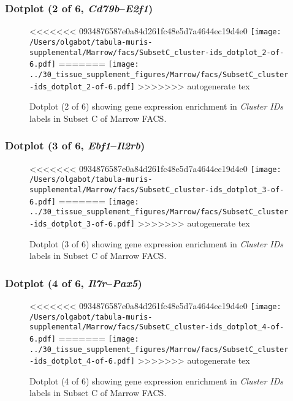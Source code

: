 \clearpage

\subsubsection{Dotplot (2 of 6, \emph{Cd79b}--\emph{E2f1})}
\begin{figure}[h]
\centering
<<<<<<< 0934876587e0a84d261fc48e5d7a4644ec19d4e0
\texttt{[image: /Users/olgabot/tabula-muris-supplemental/Marrow/facs/SubsetC\_cluster-ids\_dotplot\_2-of-6.pdf]}
=======
\texttt{[image: ../30\_tissue\_supplement\_figures/Marrow/facs/SubsetC\_cluster-ids\_dotplot\_2-of-6.pdf]}
>>>>>>> autogenerate tex

\caption{ Dotplot (2 of 6)  showing gene expression enrichment in \emph{Cluster IDs} labels in Subset C of Marrow FACS. }
\end{figure}


\clearpage

\subsubsection{Dotplot (3 of 6, \emph{Ebf1}--\emph{Il2rb})}
\begin{figure}[h]
\centering
<<<<<<< 0934876587e0a84d261fc48e5d7a4644ec19d4e0
\texttt{[image: /Users/olgabot/tabula-muris-supplemental/Marrow/facs/SubsetC\_cluster-ids\_dotplot\_3-of-6.pdf]}
=======
\texttt{[image: ../30\_tissue\_supplement\_figures/Marrow/facs/SubsetC\_cluster-ids\_dotplot\_3-of-6.pdf]}
>>>>>>> autogenerate tex

\caption{ Dotplot (3 of 6)  showing gene expression enrichment in \emph{Cluster IDs} labels in Subset C of Marrow FACS. }
\end{figure}


\clearpage

\subsubsection{Dotplot (4 of 6, \emph{Il7r}--\emph{Pax5})}
\begin{figure}[h]
\centering
<<<<<<< 0934876587e0a84d261fc48e5d7a4644ec19d4e0
\texttt{[image: /Users/olgabot/tabula-muris-supplemental/Marrow/facs/SubsetC\_cluster-ids\_dotplot\_4-of-6.pdf]}
=======
\texttt{[image: ../30\_tissue\_supplement\_figures/Marrow/facs/SubsetC\_cluster-ids\_dotplot\_4-of-6.pdf]}
>>>>>>> autogenerate tex

\caption{ Dotplot (4 of 6)  showing gene expression enrichment in \emph{Cluster IDs} labels in Subset C of Marrow FACS. }
\end{figure}


